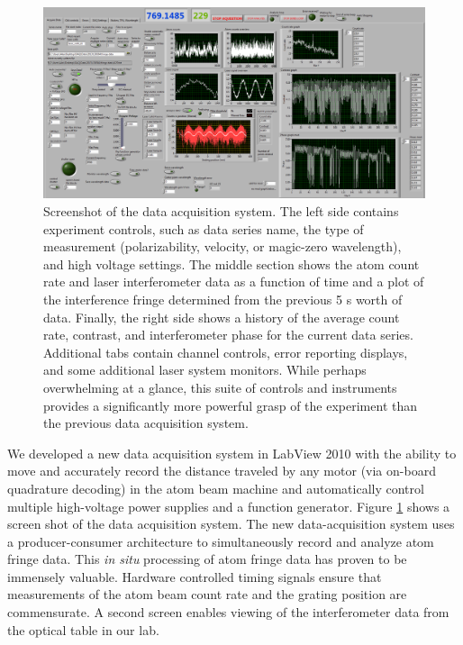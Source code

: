 \begin{figure}
\includegraphics[width=1\textwidth]{Figures/daqScreenShotEdit.png}
\caption[Screenshot of the improved data acquisition system]{\label{DAQpicture}Screenshot of the data acquisition system. The left side contains experiment controls, such as data series name, the type of measurement (polarizability, velocity, or magic-zero wavelength), and high voltage settings. The middle section shows the atom count rate and laser interferometer data as a function of time and a plot of the interference fringe determined from the previous 5 s worth of data. Finally, the right side shows a history of the average count rate, contrast, and interferometer phase for the current data series. Additional tabs contain channel controls, error reporting displays, and some additional laser system monitors. While perhaps overwhelming at a glance, this suite of controls and instruments provides a significantly more powerful grasp of the experiment than the previous data acquisition system.}
\end{figure}


We developed a new data acquisition system in LabView 2010 with the ability to move and accurately record the distance traveled by any motor (via on-board quadrature decoding) in the atom beam machine and automatically control multiple high-voltage power supplies and a function generator. Figure \ref{DAQpicture} shows a screen shot of the data acquisition system. The new data-acquisition system uses a producer-consumer architecture to simultaneously record and analyze atom fringe data. This \emph{in situ} processing of atom fringe data has proven to be immensely valuable. Hardware controlled timing signals ensure that measurements of the atom beam count rate and the grating position are commensurate. A second screen enables viewing of the interferometer data from the optical table in our lab. 







